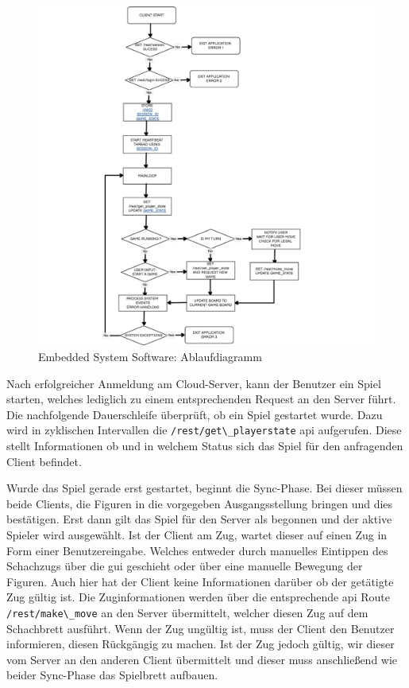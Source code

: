 \begin{figure}
\centering
\includegraphics{images/ATC_gameclient_statemachiene.png}
\caption{Embedded System Software: Ablaufdiagramm
\label{ATC_gameclient_statemachiene}}
\end{figure}

Nach erfolgreicher Anmeldung am Cloud-Server, kann der Benutzer ein
Spiel starten, welches lediglich zu einem entsprechenden Request an den
Server führt. Die nachfolgende Dauerschleife überprüft, ob ein Spiel
gestartet wurde. Dazu wird in zyklischen Intervallen die
\passthrough{\lstinline!/rest/get\_playerstate!} \gls{api} aufgerufen.
Diese stellt Informationen ob und in welchem Status sich das Spiel für
den anfragenden Client befindet.

Wurde das Spiel gerade erst gestartet, beginnt die Sync-Phase. Bei
dieser müssen beide Clients, die Figuren in die vorgegeben
Ausgangsstellung bringen und dies bestätigen. Erst dann gilt das Spiel
für den Server als begonnen und der aktive Spieler wird ausgewählt. Ist
der Client am Zug, wartet dieser auf einen Zug in Form einer
Benutzereingabe. Welches entweder durch manuelles Eintippen des
Schachzugs über die \gls{gui} geschieht oder über eine manuelle Bewegung
der Figuren. Auch hier hat der Client keine Informationen darüber ob der
getätigte Zug gültig ist. Die Zuginformationen werden über die
entsprechende \gls{api} Route \passthrough{\lstinline!/rest/make\_move!}
an den Server übermittelt, welcher diesen Zug auf dem Schachbrett
ausführt. Wenn der Zug ungültig ist, muss der Client den Benutzer
informieren, diesen Rückgängig zu machen. Ist der Zug jedoch gültig, wir
dieser vom Server an den anderen Client übermittelt und dieser muss
anschließend wie beider Sync-Phase das Spielbrett aufbauen.


